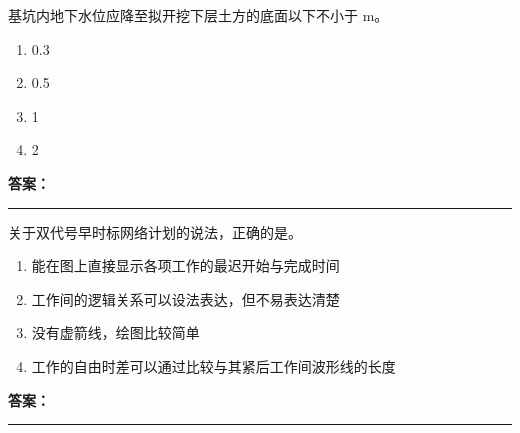 \documentclass[UTF8,fontset=fandol,11pt]{ctexart}
\newcommand{\answerline}{\textcolor{answerred}{\rule{2.4cm}{0.7pt}}}
\begin{document}
\vspace{0.2em}

\begin{quizbox}[title={乱序第 85 题｜第一章土方工程}]

基坑内地下水位应降至拟开挖下层土方的底面以下不小于 m。\\

\begin{enumerate}[label=\Alph*.]

\item 0.3

\item 0.5

\item 1

\item 2

\end{enumerate}

\textbf{\textcolor{answerred}{答案：}} \answerline

\end{quizbox}

\vspace{0.2em}

\begin{quizbox}[title={乱序第 86 题｜第十一章网络计划技术}]

关于双代号早时标网络计划的说法，正确的是。\\

\begin{enumerate}[label=\Alph*.]

\item 能在图上直接显示各项工作的最迟开始与完成时间

\item 工作间的逻辑关系可以设法表达，但不易表达清楚

\item 没有虚箭线，绘图比较简单

\item 工作的自由时差可以通过比较与其紧后工作间波形线的长度

\end{enumerate}

\textbf{\textcolor{answerred}{答案：}} \answerline

\end{quizbox}

\vspace{0.2em}
\end{document}
